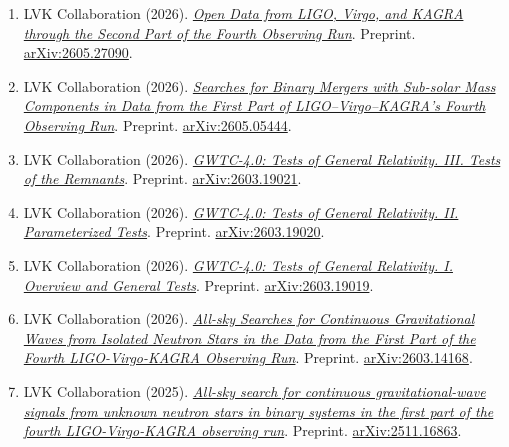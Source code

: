 \documentclass[11pt]{article}
\begin{document}
\begin{enumerate}[start=49]
\item LVK Collaboration (2026). \href{https://arxiv.org/abs/2605.27090}{\textit{Open Data from LIGO, Virgo, and KAGRA through the Second Part of the Fourth Observing Run}}. Preprint. \href{https://arxiv.org/abs/2605.27090}{arXiv:2605.27090}.
\item LVK Collaboration (2026). \href{https://arxiv.org/abs/2605.05444}{\textit{Searches for Binary Mergers with Sub-solar Mass Components in Data from the First Part of LIGO--Virgo--KAGRA's Fourth Observing Run}}. Preprint. \href{https://arxiv.org/abs/2605.05444}{arXiv:2605.05444}.
\item LVK Collaboration (2026). \href{https://arxiv.org/abs/2603.19021}{\textit{GWTC-4.0: Tests of General Relativity. III. Tests of the Remnants}}. Preprint. \href{https://arxiv.org/abs/2603.19021}{arXiv:2603.19021}.
\item LVK Collaboration (2026). \href{https://arxiv.org/abs/2603.19020}{\textit{GWTC-4.0: Tests of General Relativity. II. Parameterized Tests}}. Preprint. \href{https://arxiv.org/abs/2603.19020}{arXiv:2603.19020}.
\item LVK Collaboration (2026). \href{https://arxiv.org/abs/2603.19019}{\textit{GWTC-4.0: Tests of General Relativity. I. Overview and General Tests}}. Preprint. \href{https://arxiv.org/abs/2603.19019}{arXiv:2603.19019}.
\item LVK Collaboration (2026). \href{https://arxiv.org/abs/2603.14168}{\textit{All-sky Searches for Continuous Gravitational Waves from Isolated Neutron Stars in the Data from the First Part of the Fourth LIGO-Virgo-KAGRA Observing Run}}. Preprint. \href{https://arxiv.org/abs/2603.14168}{arXiv:2603.14168}.
\item LVK Collaboration (2025). \href{https://arxiv.org/abs/2511.16863}{\textit{All-sky search for continuous gravitational-wave signals from unknown neutron stars in binary systems in the first part of the fourth LIGO-Virgo-KAGRA observing run}}. Preprint. \href{https://arxiv.org/abs/2511.16863}{arXiv:2511.16863}.
\end{enumerate}
\end{document}

